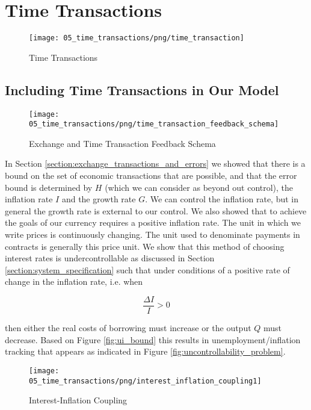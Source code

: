 \section{Time Transactions}
\label{section:time_transactions}

\begin{figure}[H]
\centering
\texttt{[image: 05\_time\_transactions/png/time\_transaction]}
\caption{Time Transactions}
\label{fig:time_transactions2}
\end{figure}

\subsection{Including Time Transactions in Our Model}

\begin{figure}[H]
\centering
\texttt{[image: 05\_time\_transactions/png/time\_transaction\_feedback\_schema]}
\caption{Exchange and Time Transaction Feedback Schema}
\label{fig:exchange_and_time_transaction_schema1}
\end{figure}

In Section \ref{section:exchange_transactions_and_errors} we showed that there is a bound on the set of
economic transactions that are possible, and that the error bound is determined by $H$ (which we can
consider as beyond out control), the inflation rate $I$ and the growth rate $G$. We can control the
inflation rate, but in general the growth rate is external to our control. We also showed that to
achieve the goals of our currency requires a positive inflation rate. The unit in which we write
prices is continuously changing. The unit used to denominate payments in contracts is generally this
price unit. We show that this method of choosing interest rates is undercontrollable as discussed in
Section \ref{section:system_specification} such that under conditions of a positive rate of change
in the inflation rate, i.e. when

\[
    \frac {\Delta I} I > 0
\]

then either the real costs of borrowing must increase or the output $Q$ must decrease. Based on   
Figure \ref{fig:ui_bound} this results in unemployment/inflation tracking that appears as indicated
in Figure \ref{fig:uncontrollability_problem}.

\begin{figure}[H]
\centering
\texttt{[image: 05\_time\_transactions/png/interest\_inflation\_coupling1]}
\caption{Interest-Inflation Coupling}
\label{fig:interest_inflation_coupling}
\end{figure}

